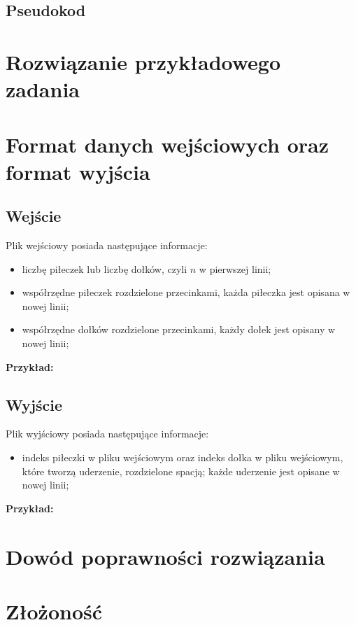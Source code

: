 \documentclass[10pt,a4paper]{article}
\begin{document}
	\subsection{Pseudokod}
	
	\section{Rozwiązanie przykładowego zadania}
	
	\section{Format danych wejściowych oraz format wyjścia}
	
	\subsection{Wejście}
	
	Plik wejściowy posiada następujące informacje:
	\begin{itemize}
		\item liczbę piłeczek lub liczbę dołków, czyli $n$ w pierwszej linii;
		\item współrzędne piłeczek rozdzielone przecinkami, każda piłeczka jest opisana w nowej linii;
		\item współrzędne dołków rozdzielone przecinkami, każdy dołek jest opisany w nowej linii;
	\end{itemize}

	\textbf{Przykład:} 
	
	\subsection{Wyjście}
	
	Plik wyjściowy posiada następujące informacje:
	\begin{itemize}
		\item indeks piłeczki w pliku wejściowym oraz indeks dołka w pliku wejściowym, które tworzą uderzenie, rozdzielone spacją; każde uderzenie jest opisane w nowej linii;
	\end{itemize}
	
	\textbf{Przykład:} 
	
	\section{Dowód poprawności rozwiązania}
	
	
	\section{Złożoność}
	
\end{document}
